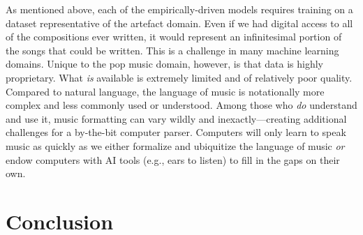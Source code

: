 \documentclass[letterpaper]{article}
\begin{document}
As mentioned above, each of the empirically-driven models requires training on a dataset representative of the artefact domain. Even if we had digital access to all of the compositions ever written, it would represent an infinitesimal portion of the songs that could be written. This is a challenge in many machine learning domains. Unique to the pop music domain, however, is that data is highly proprietary. What \textit{is} available is extremely limited and of relatively poor quality. Compared to natural language, the language of music is notationally more complex and less commonly used or understood. Among those who \textit{do} understand and use it, music formatting can vary wildly and inexactly---creating additional challenges for a by-the-bit computer parser. Computers will only learn to speak music as quickly as we either formalize and ubiquitize the language of music \textit{or} endow computers with AI tools (e.g., ears to listen) to fill in the gaps on their own.

\section{Conclusion}



\end{document}
